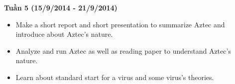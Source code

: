 \hspace{0.5cm}\textbf{Tuần 5 (15/9/2014 - 21/9/2014)}
\begin{itemize}
\item{Make a short report and short presentation to summarize Aztec and introduce about Aztec's nature.}
\item{Analyze and run Aztec as well as reading paper to understand Aztec's nature.}
\item{Learn about standard start for a virus and some virus's theories.}
\end{itemize}
